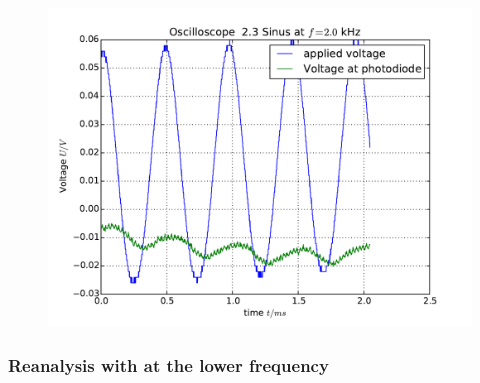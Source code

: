 \begin{figure}
    \includegraphics[width=15cm]{analysis/figures/23sinus03}
    \caption{}
\end{figure}

\clearpage
\subsubsection{Reanalysis with at the lower frequency}
